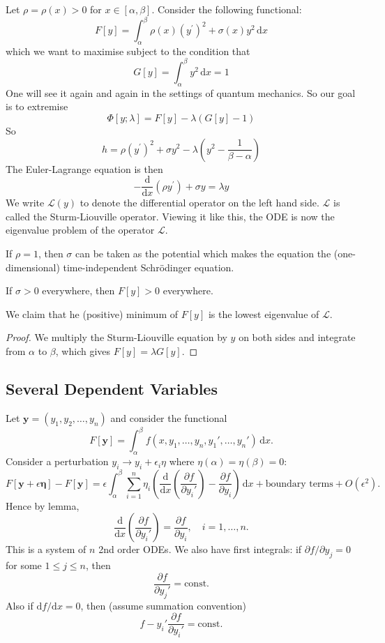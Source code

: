 \documentclass{article}
\begin{document}
\begin{example}\label{sturm-liouville}
    Let $\rho=\rho(x)>0$ for $x\in [\alpha,\beta]$.
    Consider the following functional:
    $$F[y]=\int_\alpha^\beta\rho(x)(y^\prime)^2+\sigma(x)y^2\,\mathrm dx$$
    which we want to maximise subject to the condition that
    $$G[y]=\int_\alpha^\beta y^2\,\mathrm dx=1$$
    One will see it again and again in the settings of quantum mechanics.
    So our goal is to extremise
    $$\Phi[y;\lambda]=F[y]-\lambda(G[y]-1)$$
    So
    $$h=\rho(y^\prime)^2+\sigma y^2-\lambda\left( y^2-\frac{1}{\beta-\alpha} \right)$$
    The Euler-Lagrange equation is then
    $$-\frac{\mathrm d}{\mathrm dx}(\rho y^\prime)+\sigma y=\lambda y$$
    We write $\mathcal L(y)$ to denote the differential operator on the left hand side.
    $\mathcal L$ is called the Sturm-Liouville operator.
    Viewing it like this, the ODE is now the eigenvalue problem of the operator $\mathcal L$.
\end{example}
\begin{remark}
    If $\rho=1$, then $\sigma$ can be taken as the potential which makes the equation the (one-dimensional) time-independent Schr\"odinger equation.
\end{remark}
If $\sigma>0$ everywhere, then $F[y]>0$ everywhere.
\begin{claim}
    We claim that he (positive) minimum of $F[y]$ is the lowest eigenvalue of $\mathcal L$.
\end{claim}
\begin{proof}
    We multiply the Sturm-Liouville equation by $y$ on both sides and integrate from $\alpha$ to $\beta$, which gives $F[y]=\lambda G[y]$.
\end{proof}

\subsection{Several Dependent Variables}
Let $ \mathbf{y}=(y_1,y_2,\dots,y_n) $ and consider the functional 
\[
    F[\mathbf{y}] = \int_{\alpha}^{\beta} f(x,y_1,\dots,y_n, y_1',\dots,y_n') \,\mathrm{d}x.
\]
Consider a perturbation $ y_i \to y_i + \epsilon_i \eta $ where $ \eta(\alpha)=\eta(\beta)=0 $:
\[
    F[\mathbf{y}+\epsilon \boldsymbol{\eta}] - F[\mathbf{y}] = \epsilon\int_{\alpha}^{\beta} \sum_{i=1}^{n} \eta_i\left( \frac{\mathrm{d}}{\mathrm{d}x}\left( \frac{\partial f}{\partial y_i'}  \right) -\frac{\partial f}{\partial y_i} \right)  \,\mathrm{d}x + \text{boundary terms} + O(\epsilon^2).
\]
Hence by lemma, 
\[
    \frac{\mathrm{d}}{\mathrm{d}x}\left( \frac{\partial f}{\partial y_i'}  \right) = \frac{\partial f}{\partial y_i},\quad i=1,\dots,n.  
\]
This is a system of $n$ 2nd order ODEs. We also have first integrals: if $ \partial f/\partial y_j=0  $ for some $ 1\le j\le n $, then 
\[
    \frac{\partial f}{\partial y_j'}=\text{const}. 
\]
Also if $ \mathrm{d} f / \mathrm{d} x = 0 $, then (assume summation convention)
\[
    f - y_i' \frac{\partial f}{\partial y_i'}= \text{const}. 
\]
\newpage
\end{document}
